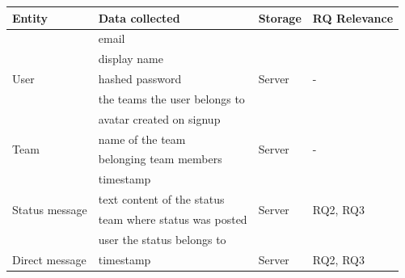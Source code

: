 \begin{table}[h] \footnotesize
    \centering
    \begin{tabularx}{.9\textwidth}{l X l l}
        \toprule
        Entity                               & Data collected                         & Storage                 & RQ Relevance                  \\
        \midrule
        \multirow{5}{*}{User}                & email                                  & \multirow{5}{*}{Server} & \multirow{5}{*}{-}            \\
                                             & display name                           &                         &                               \\
                                             & hashed password                        &                         &                               \\
                                             & the teams the user belongs to          &                         &                               \\
                                             & avatar created on signup               &                         &                               \\
        \midrule
        \multirow{2}{*}{Team}                & name of the team                       & \multirow{2}{*}{Server} & \multirow{2}{*}{-}            \\
                                             & belonging team members                 &                         &                               \\
        \midrule
        \multirow{4}{*}{Status message}      & timestamp                              & \multirow{4}{*}{Server} & \multirow{4}{*}{RQ2, RQ3    } \\
                                             & text content of the status             &                         &                               \\
                                             & team where status was posted           &                         &                               \\
                                             & user the status belongs to             &                         &                               \\
        \midrule
        \multirow{4}{*}{Direct message}      & timestamp                              & \multirow{4}{*}{Server} & \multirow{4}{*}{RQ2, RQ3    } \\

\end{tabularx}
\end{table}
